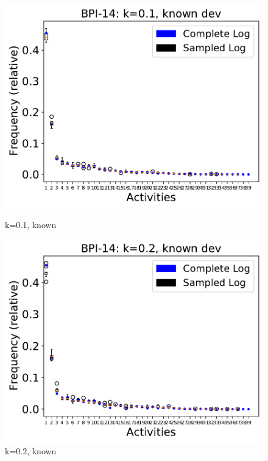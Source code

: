 \documentclass[landscape]{article}
\begin{document}
\begin{figure}[!htb]
	\centering
	\begin{minipage}{0.2\textwidth}
		\includegraphics[width=1.0\textwidth]{../Detail_Incident_Activity/Detail_Incident_Activity_deviationsApprox_0.1_NONALIGNING_KNOWN.pdf}
		\caption{k=0.1, known}
	\end{minipage}
	\hfill
	\begin{minipage}{0.2\textwidth}
		\includegraphics[width=1.0\textwidth]{../Detail_Incident_Activity/Detail_Incident_Activity_deviationsApprox_0.2_NONALIGNING_KNOWN.pdf}
		\caption{k=0.2, known}
	\end{minipage}

\end{figure}
\end{document}
